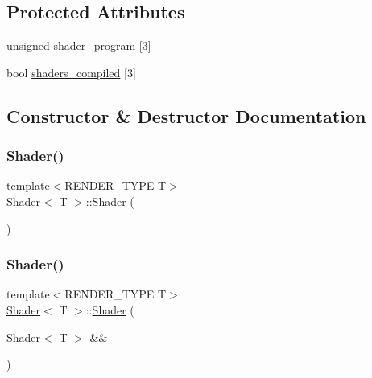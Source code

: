 \subsection*{Protected Attributes}
\begin{DoxyCompactItemize}
\item 
unsigned \mbox{\hyperlink{classShader_af8ec4edd2b1b56f32ce416280ff9b9e1}{shader\+\_\+program}} \mbox{[}3\mbox{]}
\item 
bool \mbox{\hyperlink{classShader_a057162ea090f838f7fbb658cb301efc4}{shaders\+\_\+compiled}} \mbox{[}3\mbox{]}
\end{DoxyCompactItemize}


\subsection{Constructor \& Destructor Documentation}
\mbox{\label{classShader_a02faa1d7140779d7a24e06d1aff58d68}} 
\subsubsection{\texorpdfstring{Shader()}{Shader()}\hspace{0.1cm}{\footnotesize\ttfamily [1/3]}}
{\footnotesize\ttfamily template$<$R\+E\+N\+D\+E\+R\+\_\+\+T\+Y\+PE T$>$ \\
\mbox{\hyperlink{classShader}{Shader}}$<$ T $>$\+::\mbox{\hyperlink{classShader}{Shader}} (\begin{DoxyParamCaption}{ }\end{DoxyParamCaption})\hspace{0.3cm}{\ttfamily [inline]}}

\mbox{\label{classShader_a7e30078f161d1c9f48a7b3921c01f816}} 
\subsubsection{\texorpdfstring{Shader()}{Shader()}\hspace{0.1cm}{\footnotesize\ttfamily [2/3]}}
{\footnotesize\ttfamily template$<$R\+E\+N\+D\+E\+R\+\_\+\+T\+Y\+PE T$>$ \\
\mbox{\hyperlink{classShader}{Shader}}$<$ T $>$\+::\mbox{\hyperlink{classShader}{Shader}} (\begin{DoxyParamCaption}\item[{\mbox{\hyperlink{classShader}{Shader}}$<$ T $>$ \&\&}]{ }\end{DoxyParamCaption})\hspace{0.3cm}{\ttfamily [delete]}}


